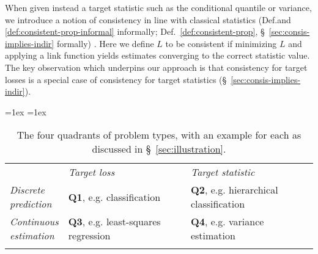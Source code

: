 \documentclass{article} %
\newcommand{\Comments}{0}
\newcommand{\mytodo}[2]{\ifnum\Comments=1%
	\todo[linecolor=#1!80!black,backgroundcolor=#1,bordercolor=#1!80!black]{#2}\fi}
\newcommand{\raft}[1]{\mytodo{green!20!white}{RF: #1}}
\newcommand{\jessiet}[1]{\mytodo{teal!20!white}{JF: #1}}
\begin{document}
When given instead a target statistic such as the conditional quantile or variance, we introduce a notion of consistency in line with classical statistics (Def.and \ref{def:consistent-prop-informal} informally; Def.~\ref{def:consistent-prop}, \S~\ref{sec:consis-implies-indir} formally) \citep{gyorfi2006distribution, fan1998efficient,ruppert1997local}.
Here we define $L$ to be consistent if minimizing $L$ and applying a link function yields estimates converging to the correct statistic value.
The key observation which underpins our approach is that consistency for target losses is a special case of consistency for target statistics (\S~\ref{sec:consis-implies-indir}).
\begin{table}[h!]
  \vspace*{10pt}
  \begin{center}
    \aboverulesep=1ex
    \belowrulesep=1ex
    \begin{tabular}{p{12ex}ll}
      & \emph{Target loss}  & \emph{Target statistic}\\
      \cmidrule[1pt]{2-3}
      \parbox{12ex}{\emph{Discrete \\ prediction}} & \textbf{Q1}, e.g. classification  & \textbf{Q2}, e.g. hierarchical classification\\ 
      \parbox{12ex}{\emph{Continuous \\ estimation}} & \textbf{Q3}, e.g. least-squares regression & \textbf{Q4}, e.g. variance estimation\\ 
      \\
    \end{tabular}\vspace*{-5pt}
    \caption{The four quadrants of problem types, with an example for each as discussed in \S~\ref{sec:illustration}.\vspace*{-10pt}}
    \label{tab:quadrants}
  \end{center}
\end{table}
\end{document}
